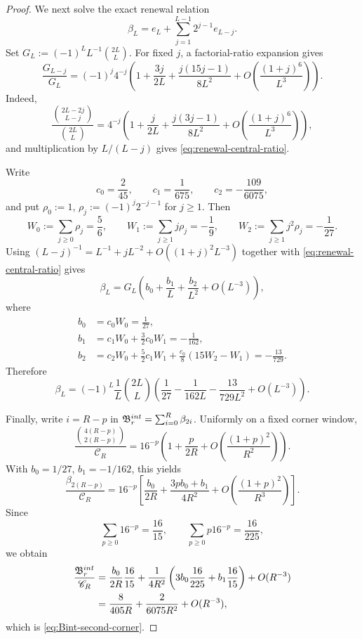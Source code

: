 \documentclass[10pt,a4paper]{amsart}
\begin{document}
\begin{proof}
We next solve the exact renewal relation
\[
 \beta_L=e_L+\sum_{j=1}^{L-1}2^{j-1}e_{L-j}.
\]
Set \(G_L:=(-1)^LL^{-1}\binom{2L}{L}\).  For fixed \(j\), a
factorial-ratio expansion gives
\begin{equation}
 \frac{G_{L-j}}{G_L}
 =(-1)^j4^{-j}
 \left(1+\frac{3j}{2L}
 +\frac{j(15j-1)}{8L^2}
 +O\!\left(\frac{(1+j)^6}{L^3}\right)\right).
 \label{eq:renewal-central-ratio}
\end{equation}
Indeed,
\[
 \frac{\binom{2L-2j}{L-j}}{\binom{2L}{L}}
 =4^{-j}\left(1+\frac{j}{2L}
 +\frac{j(3j-1)}{8L^2}
 +O\!\left(\frac{(1+j)^6}{L^3}\right)\right),
\]
and multiplication by \(L/(L-j)\) gives
\eqref{eq:renewal-central-ratio}.

Write
\[
 c_0=\frac2{45},\qquad c_1=\frac1{675},\qquad
 c_2=-\frac{109}{6075},
\]
and put \(\rho_0:=1\),
\(\rho_j:=(-1)^j2^{-j-1}\) for \(j\ge1\).  Then
\begin{equation}
 W_0:=\sum_{j\ge0}\rho_j=\frac56,
 \qquad
 W_1:=\sum_{j\ge1}j\rho_j=-\frac19,
 \qquad
 W_2:=\sum_{j\ge1}j^2\rho_j=-\frac1{27}.
 \label{eq:renewal-weight-moments}
\end{equation}
Using \((L-j)^{-1}=L^{-1}+jL^{-2}+O((1+j)^2L^{-3})\)
together with \eqref{eq:renewal-central-ratio} gives
\[
 \beta_L=G_L\left(b_0+\frac{b_1}{L}+\frac{b_2}{L^2}
 +O(L^{-3})\right),
\]
where
\begin{align*}
 b_0&=c_0W_0=\frac1{27},\\
 b_1&=c_1W_0+\frac32c_0W_1=-\frac1{162},\\
 b_2&=c_2W_0+\frac52c_1W_1
 +\frac{c_0}{8}(15W_2-W_1)=-\frac{13}{729}.
\end{align*}
Therefore
\begin{equation}
 {
 \beta_L=(-1)^L\frac1L\binom{2L}{L}
 \left(
 \frac1{27}-\frac1{162L}-\frac{13}{729L^2}
 +O(L^{-3})\right).}
 \label{eq:betaL-second}
\end{equation}

Finally, write \(i=R-p\) in
\(\mathfrak B_r^{\rm int}=\sum_{i=0}^{R}\beta_{2i}\).  Uniformly on a
fixed corner window,
\[
 \frac{\binom{4(R-p)}{2(R-p)}}{\mathscr C_R}
 =16^{-p}\left(1+\frac{p}{2R}
 +O\!\left(\frac{(1+p)^2}{R^2}\right)\right).
\]
With \(b_0=1/27\), \(b_1=-1/162\), this yields
\[
 \frac{\beta_{2(R-p)}}{\mathscr C_R}
 =16^{-p}\left[
 \frac{b_0}{2R}+\frac{3pb_0+b_1}{4R^2}
 +O\!\left(\frac{(1+p)^2}{R^3}\right)\right].
\]
Since
\[
 \sum_{p\ge0}16^{-p}=\frac{16}{15},
 \qquad
 \sum_{p\ge0}p16^{-p}=\frac{16}{225},
\]
we obtain
\begin{align*}
 \frac{\mathfrak B_r^{\rm int}}{\mathscr C_R}
 &=\frac{b_0}{2R}\frac{16}{15}
 +\frac1{4R^2}\left(
 3b_0\frac{16}{225}+b_1\frac{16}{15}\right)
 +O(R^{-3})\\
 &=\frac{8}{405R}+\frac{2}{6075R^2}+O(R^{-3}),
\end{align*}
which is \eqref{eq:Bint-second-corner}.


\end{proof}
\end{document}
